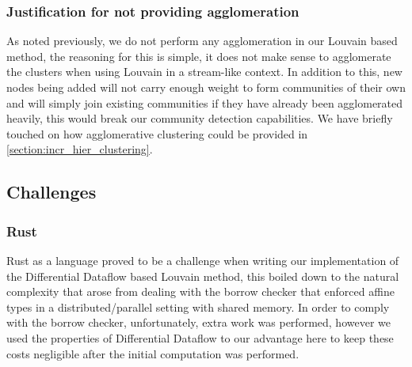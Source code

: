 \subsubsection{Justification for not providing agglomeration}
As noted previously, we do not perform any agglomeration in our Louvain based method, the reasoning for this is simple, it does not make sense to agglomerate the clusters when using Louvain in a stream-like context. In addition to this, new nodes being added will not carry enough weight to form communities of their own and will simply join existing communities if they have already been agglomerated heavily, this would break our community detection capabilities. We have briefly touched on how agglomerative clustering could be provided in \cref{section:incr_hier_clustering}.

\subsection{Challenges}
\subsubsection{Rust}
Rust as a language proved to be a challenge when writing our implementation of the Differential Dataflow based Louvain method, this boiled down to the natural complexity that arose from dealing with the borrow checker that enforced affine types in a distributed/parallel setting with shared memory. In order to comply with the borrow checker, unfortunately, extra work was performed, however we used the properties of Differential Dataflow to our advantage here to keep these costs negligible after the initial computation was performed. 

